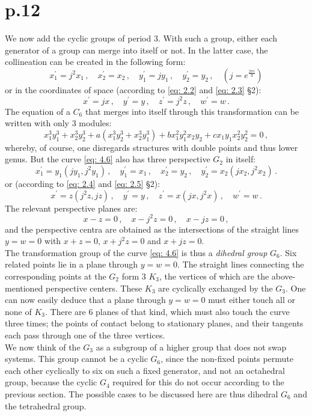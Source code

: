 \documentclass[leqno]{article}
\begin{document}
\section{p.12}
We now add the cyclic groups of period 3. With such a group, either each generator of a group can merge into itself or not. In the latter case, the collineation can be created in the following form: 
\[
x_1^\prime = j^2 x_1 \, , \quad x_2^\prime = x_2 \, , \quad y_1^\prime = j y_1 \, , \quad y_2^\prime = y_2 \, , \quad \left( j = e^{\frac{2 \pi i}{3}} \right)
\] 
or in the coordinates of space (according to \eqref{eq: 2.2} and \eqref{eq: 2.3} \S 2):
\[
x^\prime = jx \, , \quad y^\prime = y \, , \quad z^\prime = j^2 z \, , \quad w^\prime = w \, . 
\]
The equation of a $C_6$ that merges into itself through this transformation can be written with only 3 modules:
\begin{equation}\label{eq: 4.6}
x_1^3 y_1^3 + x_2^3 y_2^3 + a(x_1^3 y_2^3 + x_2^3 y_1^3) + b x_1^2 y_1^2 x_2 y_2 + c x_1 y_1 x_2^2 y_2^2 = 0 \, , \tag{6}
\end{equation}
whereby, of course, one disregards structures with double points and thus lower genus. But the curve \eqref{eq: 4.6} also has three perspective $G_2$ in itself: 
\[      
x_1^\prime = y_1 (j y_1 , j^2 y_1) \, , \quad y_1^\prime = x_1 \, , \quad x_2^\prime = y_2 \, , \quad y_2^\prime = x_2 (j x_2, j^2 x_2) \, .  
\]
or (according to \eqref{eq: 2.4} and \eqref{eq: 2.5} \S 2):
\[
x^\prime = z(j^2z, jz) \, , \quad y^\prime = y \, , \quad z^\prime = x(jx, j^2x) \, , \quad w^\prime = w \, . 
\]
The relevant perspective planes are: 
\[
x-z=0 \, , \quad x-j^2z=0 \, , \quad x-jz=0 \, , 
\] 
and the perspective centra are obtained as the intersections of the straight lines $y=w=0$ with $x+z=0$, $x+j^2z=0$ and $x+jz=0 $. \\
The transformation group of the curve \eqref{eq: 4.6} is thus a \textit{dihedral group} $G_6$. Six related points lie in a plane through $y=w=0$. The straight lines connecting the corresponding points at the $G_2$ form 3 $K_3$, the vertices of which are the above-mentioned perspective centers. These $K_3$ are cyclically exchanged by the $G_3$. One can now easily deduce that a plane through $y=w=0$ must either touch all or none of $K_3$. There are 6 planes of that kind, which must also touch the curve three times; the points of contact belong to stationary planes, and their tangents each pass through one of the three vertices. \\
We now think of the $G_3$ as a subgroup of a higher group that does not swap systems. This group cannot be a cyclic $G_6$, since the non-fixed points permute each other cyclically to six on such a fixed generator, and not an octahedral group, because the cyclic $G_4$ required for this do not occur according to the previous section. The possible cases to be discussed here are thus dihedral $G_6$ and the tetrahedral group. \\
\end{document}
